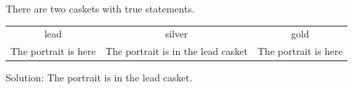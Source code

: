 There are two caskets with true statements.
\begin{tabular}{ccc}
\toprule
lead & silver & gold\\
The portrait is here & The portrait is in the lead casket & The portrait is here\\
\bottomrule
\end{tabular}
Solution: The portrait is in the lead casket.